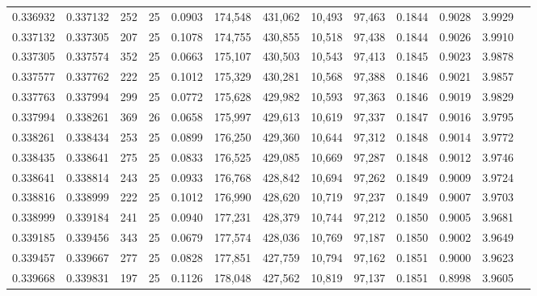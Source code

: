 \begin{tabular}{rrrrrrrrrrrrr}
0.336932 & 0.337132 &   252 &  25 &                                     0.0903 & 174,548 & 431,062 &  10,493 &  97,463 & 0.1844 & 0.9028 & 3.9929 \\
0.337132 & 0.337305 &   207 &  25 &                                     0.1078 & 174,755 & 430,855 &  10,518 &  97,438 & 0.1844 & 0.9026 & 3.9910 \\
0.337305 & 0.337574 &   352 &  25 &                                     0.0663 & 175,107 & 430,503 &  10,543 &  97,413 & 0.1845 & 0.9023 & 3.9878 \\
0.337577 & 0.337762 &   222 &  25 &                                     0.1012 & 175,329 & 430,281 &  10,568 &  97,388 & 0.1846 & 0.9021 & 3.9857 \\
0.337763 & 0.337994 &   299 &  25 &                                     0.0772 & 175,628 & 429,982 &  10,593 &  97,363 & 0.1846 & 0.9019 & 3.9829 \\
0.337994 & 0.338261 &   369 &  26 &                                     0.0658 & 175,997 & 429,613 &  10,619 &  97,337 & 0.1847 & 0.9016 & 3.9795 \\
0.338261 & 0.338434 &   253 &  25 &                                     0.0899 & 176,250 & 429,360 &  10,644 &  97,312 & 0.1848 & 0.9014 & 3.9772 \\
0.338435 & 0.338641 &   275 &  25 &                                     0.0833 & 176,525 & 429,085 &  10,669 &  97,287 & 0.1848 & 0.9012 & 3.9746 \\
0.338641 & 0.338814 &   243 &  25 &                                     0.0933 & 176,768 & 428,842 &  10,694 &  97,262 & 0.1849 & 0.9009 & 3.9724 \\
0.338816 & 0.338999 &   222 &  25 &                                     0.1012 & 176,990 & 428,620 &  10,719 &  97,237 & 0.1849 & 0.9007 & 3.9703 \\
0.338999 & 0.339184 &   241 &  25 &                                     0.0940 & 177,231 & 428,379 &  10,744 &  97,212 & 0.1850 & 0.9005 & 3.9681 \\
0.339185 & 0.339456 &   343 &  25 &                                     0.0679 & 177,574 & 428,036 &  10,769 &  97,187 & 0.1850 & 0.9002 & 3.9649 \\
0.339457 & 0.339667 &   277 &  25 &                                     0.0828 & 177,851 & 427,759 &  10,794 &  97,162 & 0.1851 & 0.9000 & 3.9623 \\
0.339668 & 0.339831 &   197 &  25 &                                     0.1126 & 178,048 & 427,562 &  10,819 &  97,137 & 0.1851 & 0.8998 & 3.9605 \\

\end{tabular}
